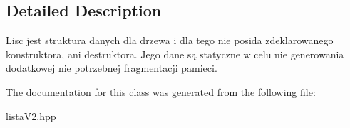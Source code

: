 \subsection{Detailed Description}
Lisc jest struktura danych dla drzewa i dla tego nie posida zdeklarowanego konstruktora, ani destruktora. Jego dane są statyczne w celu nie generowania dodatkowej nie potrzebnej fragmentacji pamieci. 

The documentation for this class was generated from the following file:\begin{DoxyCompactItemize}
\item 
listaV2.hpp\end{DoxyCompactItemize}
